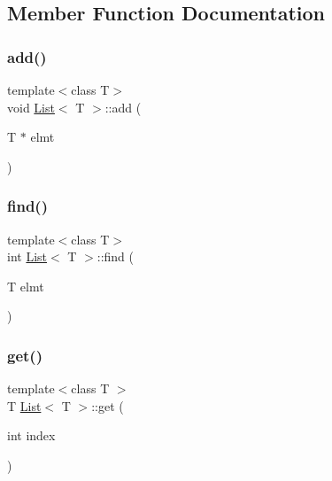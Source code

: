\subsection{Member Function Documentation}
\mbox{\label{class_list_aea51297cc29bc89acf013d43636a6a19}} 
\subsubsection{\texorpdfstring{add()}{add()}}
{\footnotesize\ttfamily template$<$class T$>$ \\
void \mbox{\hyperlink{class_list}{List}}$<$ T $>$\+::add (\begin{DoxyParamCaption}\item[{T $\ast$}]{elmt }\end{DoxyParamCaption})}

\mbox{\label{class_list_afcc0ad2940d9efbd8b487bc40e3f0067}} 
\subsubsection{\texorpdfstring{find()}{find()}}
{\footnotesize\ttfamily template$<$class T$>$ \\
int \mbox{\hyperlink{class_list}{List}}$<$ T $>$\+::find (\begin{DoxyParamCaption}\item[{T}]{elmt }\end{DoxyParamCaption})}

\mbox{\label{class_list_a8674ced74b669f6c49292a4545c5b1e3}} 
\subsubsection{\texorpdfstring{get()}{get()}}
{\footnotesize\ttfamily template$<$class T $>$ \\
T \mbox{\hyperlink{class_list}{List}}$<$ T $>$\+::get (\begin{DoxyParamCaption}\item[{int}]{index }\end{DoxyParamCaption})}

\mbox{\label{class_list_ad34f9546e1bee20ecf23a985e34c3fb8}} 
